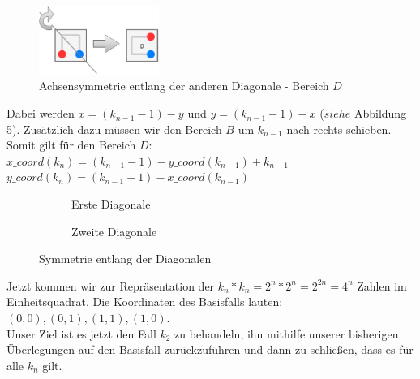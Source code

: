 \documentclass[course=erap]{aspdoc}
\begin{document}
\begin{figure}[H]
    \centering
    \includegraphics[width=0.35\textwidth, height=0.12\textheight]{../img/BereichD.png}
    \caption{Achsensymmetrie entlang der anderen Diagonale - Bereich $D$}
\end{figure}

Dabei  werden $x=(k_{n-1}-1)-y$ und $y=(k_{n-1}-1)-x$ ($siehe$ Abbildung  5).
Zusätzlich dazu müssen wir den Bereich $B$ um $k_{n-1}$ nach rechts schieben.
Somit gilt für den Bereich $D$:\\
$x\_coord(k_{n})=(k_{n-1}-1)-y\_coord(k_{n-1})+k_{n-1}$\\
$y\_coord(k_{n})=(k_{n-1}-1)-x\_coord(k_{n-1})$

\begin{figure}[H]
\centering
\begin{subfigure}{.5\textwidth}
  \centering
{}
  \caption{Erste Diagonale}
\end{subfigure}%
\begin{subfigure}{.5\textwidth}
  \centering
  \caption{Zweite Diagonale}
\end{subfigure}
\caption{Symmetrie entlang der Diagonalen}
\end{figure}


Jetzt kommen wir zur Repräsentation der $k_{n}*k_{n}=2^n*2^n=2^{2n}=4^n$ Zahlen
im Einheitsquadrat. Die Koordinaten des Basisfalls lauten: $(0,0), (0,1),
(1,1), (1,0)$.\\ Unser Ziel ist es jetzt den Fall $k_{2}$ zu behandeln, ihn
mithilfe unserer bisherigen Überlegungen auf den Basisfall zurückzuführen und
dann zu schließen, dass es für alle $k_{n}$ gilt.\\
\end{document}
